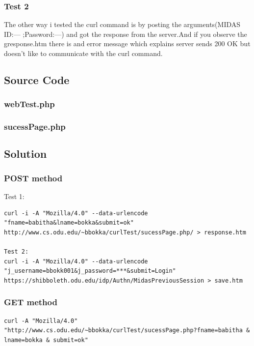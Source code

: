 \documentclass[12pt]{article}
\begin{document}
\subsubsection{Test 2 }
The other way i tested the curl command is by posting the arguments(MIDAS ID:--- ;Password:---) and got the response from the server.And if you observe the gresponse.htm there is and error message which explains server sends 200 OK but doesn't like to communicate with the curl command.
\subsection{Source Code}
\subsubsection{webTest.php}

\subsubsection{sucessPage.php}

\subsection{Solution}
\subsubsection{POST method}
Test 1:
\begin{verbatim}
curl -i -A "Mozilla/4.0" --data-urlencode "fname=babitha&lname=bokka&submit=ok" 
http://www.cs.odu.edu/~bbokka/curlTest/sucessPage.php/ > response.htm

Test 2:
curl -i -A "Mozilla/4.0" --data-urlencode "j_username=bbokk001&j_password=***&submit=Login" https://shibboleth.odu.edu/idp/Authn/MidasPreviousSession > save.htm
\end{verbatim}
\subsubsection{GET method}
\begin{verbatim}
curl -A "Mozilla/4.0" "http://www.cs.odu.edu/~bbokka/curlTest/sucessPage.php?fname=babitha & lname=bokka & submit=ok"

\end{verbatim} 
\newpage
\end{document}
